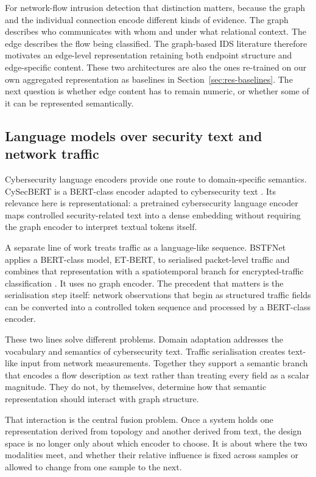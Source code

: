 For network-flow intrusion detection that distinction matters, because the graph and the
individual connection encode different kinds of evidence. The graph describes who
communicates with whom and under what relational context. The edge describes the flow being
classified. The graph-based IDS literature therefore motivates an edge-level representation
retaining both endpoint structure and edge-specific content. These two architectures are also
the ones re-trained on our own aggregated representation as baselines in
Section~\ref{sec:res-baselines}. The next question is whether edge content has to remain
numeric, or whether some of it can be represented semantically.

\subsection{Language models over security text and network traffic}

Cybersecurity language encoders provide one route to domain-specific semantics. CySecBERT
is a BERT-class encoder adapted to cybersecurity text \citep{bayer2024cysecbert}. Its
relevance here is representational: a pretrained cybersecurity language encoder maps
controlled security-related text into a dense embedding without requiring the graph encoder
to interpret textual tokens itself.

A separate line of work treats traffic as a language-like sequence. BSTFNet applies a
BERT-class model, ET-BERT, to serialised packet-level traffic and combines that
representation with a spatiotemporal branch for encrypted-traffic classification
\citep{huang2024bstfnet}. It uses no graph encoder. The precedent that matters is the
serialisation step itself: network observations that begin as structured traffic fields can
be converted into a controlled token sequence and processed by a BERT-class encoder.

These two lines solve different problems. Domain adaptation addresses the vocabulary and
semantics of cybersecurity text. Traffic serialisation creates text-like input from network
measurements. Together they support a semantic branch that encodes
a flow description as text rather than treating every field as a scalar magnitude. They do not, by
themselves, determine how that semantic representation should interact with graph structure.

That interaction is the central fusion problem. Once a system holds one representation
derived from topology and another derived from text, the design space is no longer only
about which encoder to choose. It is about where the two modalities meet, and whether their
relative influence is fixed across samples or allowed to change from one sample to the next.

